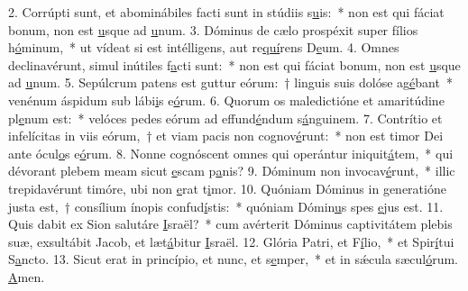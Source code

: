 2. Corrúpti sunt, et abominábiles facti sunt in stúdiis s\uline{u}is:~* non est qui fáciat bonum, non est \uline{u}sque ad \uline{u}num.
3. Dóminus de cælo prospéxit super fílios h\uline{ó}minum,~* ut vídeat si est intélligens, aut re\uline{quí}rens D\uline{e}um.
4. Omnes declinavérunt, simul inútiles f\uline{a}cti sunt:~* non est qui fáciat bonum, non est \uline{u}sque ad \uline{u}num.
5. Sepúlcrum patens est guttur eórum:~† linguis suis dolóse ag\uline{é}bant~* venénum áspidum sub lábi\uline{i}s e\uline{ó}rum.
6. Quorum os maledictióne et amaritúdine pl\uline{e}num est:~* velóces pedes eórum ad effund\uline{é}ndum s\uline{á}nguinem.
7. Contrítio et infelícitas in viis eórum,~† et viam pacis non cognov\uline{é}runt:~* non est timor Dei ante ócul\uline{o}s e\uline{ó}rum.
8. Nonne cognóscent omnes qui operántur iniquit\uline{á}tem,~* qui dévorant plebem meam sicut \uline{e}scam p\uline{a}nis?
9. Dóminum non invocav\uline{é}runt,~* illic trepidavérunt timóre, ubi non \uline{e}rat t\uline{i}mor.
10. Quóniam Dóminus in generatióne justa est,~† consílium ínopis confud\uline{í}stis:~* quóniam Dómin\uline{u}s spes \uline{e}jus est.
11. Quis dabit ex Sion salutáre \uline{I}sraël?~* cum avérterit Dóminus captivitátem plebis suæ, exsultábit Jacob, et læt\uline{á}bitur \uline{I}sraël.
12. Glória Patri, et F\uline{í}lio,~* et Spir\uline{í}tui S\uline{a}ncto.
13. Sicut erat in princípio, et nunc, et s\uline{e}mper,~* et in sǽcula sæcul\uline{ó}rum. \uline{A}men.
